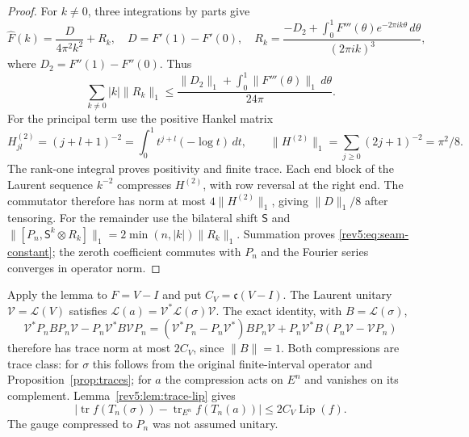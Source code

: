 \begin{proof}
For $k\ne0$, three integrations by parts give
\[
 \widehat F(k)=\frac{D}{4\pi^2k^2}+R_k,
 \quad D=F'(1)-F'(0),\quad
 R_k=\frac{-D_2+\int_0^1F'''(\theta)e^{-2\pi ik\theta}\,d\theta}
            {(2\pi ik)^3},
\]
where $D_2=F''(1)-F''(0)$.  Thus
\[
 \sum_{k\ne0}|k|\|R_k\|_1
 \leq\frac{\|D_2\|_1+\int_0^1\|F'''(\theta)\|_1\,d\theta}{24\pi}.
\]
For the principal term use the positive Hankel matrix
\[
 H^{(2)}_{jl}=(j+l+1)^{-2}
 =\int_0^1t^{j+l}(-\log t)\,dt,
 \qquad \|H^{(2)}\|_1=\sum_{j\geq0}(2j+1)^{-2}=\pi^2/8.
\]
The rank-one integral proves positivity and finite trace. Each end
block of the Laurent sequence $k^{-2}$ compresses $H^{(2)}$, with
row reversal at the right end. The commutator therefore has norm
at most $4\|H^{(2)}\|_1$, giving $\|D\|_1/8$ after tensoring.
For the remainder use the bilateral shift $\mathsf S$ and
$\|[P_n,\mathsf S^k\otimes R_k]\|_1=2\min(n,|k|)\|R_k\|_1$.
Summation proves \eqref{rev5:eq:seam-constant}; the zeroth coefficient
commutes with $P_n$ and the Fourier series converges in operator norm.
\end{proof}

Apply the lemma to $F=V-I$ and put $C_V=\mathfrak c(V-I)$.
The Laurent unitary $\mathscr V=\mathcal L(V)$ satisfies
$\mathcal L(a)=\mathscr V^*\mathcal L(\sigma)\mathscr V$.  The exact
identity, with $B=\mathcal L(\sigma)$,
\[
 \mathscr V^*P_nBP_n\mathscr V-P_n\mathscr V^*B\mathscr VP_n
 =(\mathscr V^*P_n-P_n\mathscr V^*)BP_n\mathscr V
   +P_n\mathscr V^*B(P_n\mathscr V-\mathscr VP_n)
\]
therefore has trace norm at most $2C_V$, since $\|B\|=1$.
Both compressions are trace class: for $\sigma$ this follows from the
original finite-interval operator and Proposition~\ref{prop:traces};
for $a$ the compression acts on $E^n$ and vanishes on its complement.
Lemma~\ref{rev5:lem:trace-lip} gives
\begin{equation}\label{rev5:eq:star-transfer}
 |\operatorname{tr}f(T_n(\sigma))
       -\operatorname{tr}_{E^n}f(T_n(a))|
 \leq2C_V\operatorname{Lip}(f).
\end{equation}
The gauge compressed to $P_n$ was not assumed unitary.

